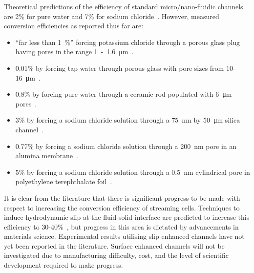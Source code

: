     Theoretical predictions of the efficiency of standard micro/nano-fluidic channels are 2\% for pure water and 7\% for sodium chloride~\cite{VanderHeyden2006}.
    However, measured conversion efficiencies as reported thus far are:
    \begin{itemize}
      \item ``far less than \SI{1}{\percent}'' forcing potassium chloride through a porous glass plug having pores in the range \SI{1}-\SI{1.6}{\micro\meter}~\cite{Olthuis2005}.
      \item 0.01\% by forcing tap water through porous glass with pore sizes from 10\thinspace--\SI{16}{\micro\metre}~\cite{Yang2003}.
      \item 0.8\% by forcing pure water through a ceramic rod populated with \SI{6}{\micro\metre} pores~\cite{Yang2004}.
      \item 3\% by forcing a sodium chloride solution through a \SI{75}{\nano\metre} by \SI{50}{\micro\metre} silica channel~\cite{Heyden2007}.
      \item 0.77\% by forcing a sodium chloride solution through a \SI{200}{\nano\metre} pore in an alumina membrane~\cite{Lu2006}.
      \item 5\% by forcing a sodium chloride solution through a \SI{0.5}{\nano\metre} cylindrical pore in polyethylene terephthalate foil~\cite{Xie2008}.
    \end{itemize}
    It is clear from the literature that there is significant progress to be made with respect to increasing the conversion efficiency of streaming cells.
    Techniques to induce hydrodynamic slip at the fluid-solid interface are predicted to increase this efficiency to 30-40\%~\cite{Davidson2008a, Ren2008}, but progress in this area is dictated by advancements in materials science.
    Experimental results utilising slip enhanced channels have not yet been reported in the literature.
    Surface enhanced channels will not be investigated due to manufacturing difficulty, cost, and the level of scientific development required to make progress.


